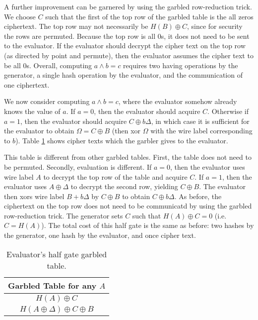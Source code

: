 A further improvement can be garnered by using the garbled row-reduction trick.
We choose $C$ such that the first of the top row of the garbled table is the all zeros ciphertext. 
The top row may not necessarily be $H(B) \oplus C$, since for security the rows are permuted. 
Because the top row is all 0s, it does not need to be sent to the evaluator. 
If the evaluator should decrypt the cipher text on the top row (as directed by point and permute), then the evaluator assumes the cipher text to be all 0s. Overall, computing $a \wedge b = c$ requires two having operations by the generator, a single hash operation by the evaluator, and the communication of one ciphertext. 

We now consider computing $a \wedge b = c$, where the evaluator somehow already knows the value of $a$.
If $a = 0$, then the evaluator should acquire $C$. 
Otherwise if $a = 1$, then the evaluator should acquire $C \oplus b\Delta$, in which case it is sufficient for the evaluator to obtain $\Omega = C \oplus B$ (then xor $\Omega$ with the wire label corresponding to $b$).
Table \ref{tbl:halfgate-gg-eval} shows cipher texts which the garbler gives to the evaluator.

This table is different from other garbled tables. 
First, the table does not need to be permuted. 
Secondly, evaluation is different.
If $a = 0$, then the evaluator uses wire label $A$ to decrypt the top row of the table and acquire $C$. 
If $a = 1$, then the evaluator uses $A \oplus \Delta$ to decrypt the second row, yielding $C \oplus B$.
The evaluator then xors wire label $B + b\Delta$ by $C \oplus B$ to obtain $C \oplus b\Delta$. 
As before, the ciphertext  on the top row does not need to be communicatd by using the garbled row-reduction trick.
The generator sets $C$ such that $H(A) \oplus C = 0$ (i.e. $C = H(A)$). 
The total cost of this half gate is the same as before: two hashes by the generator, one hash by the evaluator, and once cipher text. 

\begin{table}[h]
    \label{tbl:halfgate-gg-eval}
    \centering
    \begin{tabular}{|c|}
        \hline
        Garbled Table for any $A$ \\
        \hline
        $H(A) \oplus C$ \\
        $H(A \oplus \Delta) \oplus C \oplus B$ \\
        \hline
    \end{tabular}
    \caption{Evaluator's half gate garbled table.}
\end{table}

